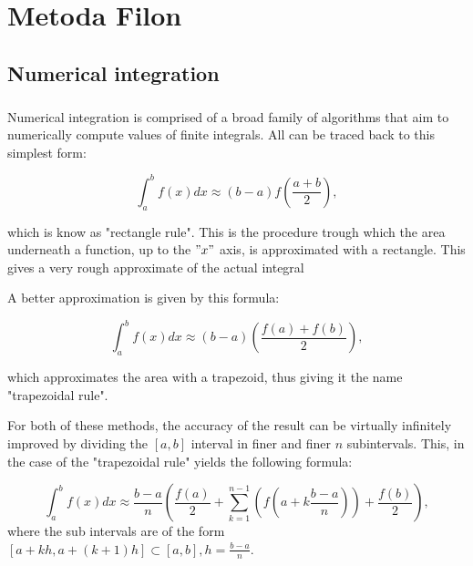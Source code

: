 \chapter{Metoda Filon}
\label{cap:cap2}

\section{Numerical integration}

\paragraph{} Numerical integration is comprised of a broad family of algorithms that aim to numerically compute values of finite integrals.
All can be traced back to this simplest form:

\begin{equation}
    \int_a^b f(x) dx \approx (b-a) f\left(\frac{a+b}{2}\right),\label{rectangle}
\end{equation}

which is know as "rectangle rule". This is the procedure trough which the area underneath a function, up to the $"x"$ axis, is approximated with a rectangle. This gives a very rough approximate of the actual integral



A better approximation is given by this formula: 

\begin{equation}
    \int_a^b f(x) dx \approx (b-a) \left(\frac{f(a)+f(b)}{2}\right),\label{trapezoid}
\end{equation}

which approximates the area with a trapezoid, thus giving it the name "trapezoidal rule".


For both of these methods, the accuracy of the result can be virtually infinitely improved by dividing the $[a,b]$ interval in finer and finer $n$ subintervals.
This, in the case of the "trapezoidal rule" yields the following formula:

\begin{equation}
    \int_a^b f(x) dx \approx \frac{b-a}{n}\left(\frac{f(a)}{2}+\sum_{k=1}^{n-1}\left(f\left(a+k\frac{b-a}{n}\right)\right)+\frac{f(b)}{2}\right),\label{composite}
\end{equation}
where the sub intervals are of the form $ [a+kh,a+(k+1)h] \subset [a,b], h=\frac{b-a}{n} $.

